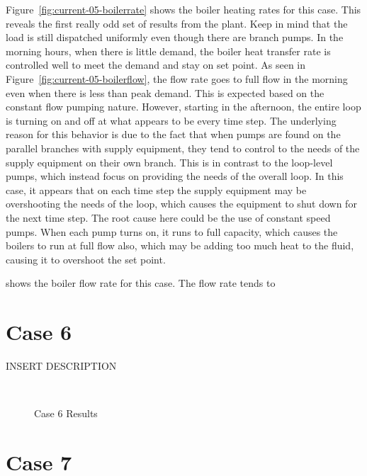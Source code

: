 \documentclass{report}
\begin{document}
      Figure~\ref{fig:current-05-boilerrate} shows the boiler heating rates for this case.
      This reveals the first really odd set of results from the plant.
      Keep in mind that the load is still dispatched uniformly even though there are branch pumps.
      In the morning hours, when there is little demand, the boiler heat transfer rate is controlled well to meet the demand and stay on set point.
      As seen in Figure~\ref{fig:current-05-boilerflow}, the flow rate goes to full flow in the morning even when there is less than peak demand.
      This is expected based on the constant flow pumping nature.
      However, starting in the afternoon, the entire loop is turning on and off at what appears to be every time step.
      The underlying reason for this behavior is due to the fact that when pumps are found on the parallel branches with supply equipment, they tend to control to the needs of the supply equipment on their own branch.
      This is in contrast to the loop-level pumps, which instead focus on providing the needs of the overall loop.
      In this case, it appears that on each time step the supply equipment may be overshooting the needs of the loop, which causes the equipment to shut down for the next time step.
      The root cause here could be the use of constant speed pumps.
      When each pump turns on, it runs to full capacity, which causes the boilers to run at full flow also, which may be adding too much heat to the fluid, causing it to overshoot the set point.

       shows the boiler flow rate for this case.
      The flow rate tends to

    \section{Case 6}\label{sec:current-06}

      INSERT DESCRIPTION

      \begin{figure*}[hbt]
        \centering
        ~
        \caption{Case 6 Results}
      \end{figure*}

    \section{Case 7}\label{sec:current-07}
\end{document}
